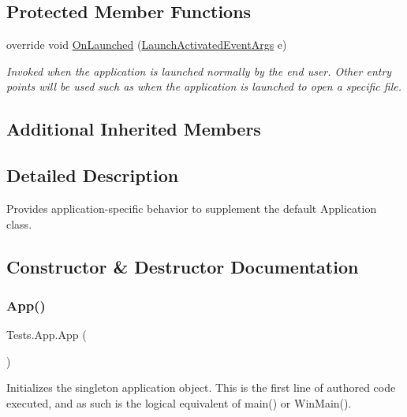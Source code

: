 \subsection*{Protected Member Functions}
\begin{DoxyCompactItemize}
\item 
override void \hyperlink{class_tests_1_1_app_a7ffc6d84af7f1b49ac42891a2548477f}{On\+Launched} (\hyperlink{class_windows_1_1_application_model_1_1_activation_1_1_launch_activated_event_args}{Launch\+Activated\+Event\+Args} e)
\begin{DoxyCompactList}\small\item\em Invoked when the application is launched normally by the end user. Other entry points will be used such as when the application is launched to open a specific file. \end{DoxyCompactList}\end{DoxyCompactItemize}
\subsection*{Additional Inherited Members}


\subsection{Detailed Description}
Provides application-\/specific behavior to supplement the default Application class. 



\subsection{Constructor \& Destructor Documentation}
\mbox{\label{class_tests_1_1_app_a93de4601ce9c974faf8a675562f5caba}} 
\subsubsection{\texorpdfstring{App()}{App()}}
{\footnotesize\ttfamily Tests.\+App.\+App (\begin{DoxyParamCaption}{ }\end{DoxyParamCaption})}



Initializes the singleton application object. This is the first line of authored code executed, and as such is the logical equivalent of main() or Win\+Main(). 



